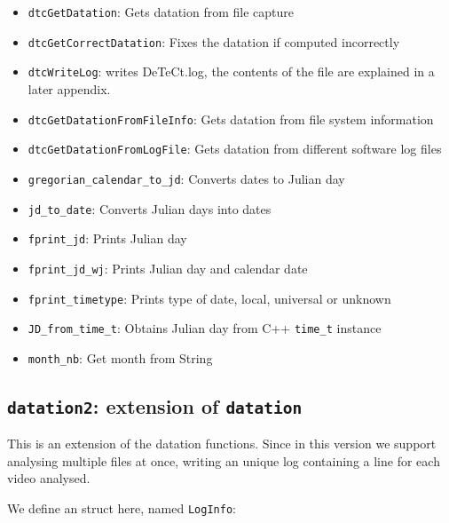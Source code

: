 \documentclass[a4paper,11pt]{memoir}
\begin{document}
\begin{itemize}
\item  \texttt{dtcGetDatation}: Gets datation from file capture
\item  \texttt{dtcGetCorrectDatation}: Fixes the datation if computed incorrectly
\item  \texttt{dtcWriteLog}: writes DeTeCt.log, the contents of the file are explained in a later
appendix.
\item  \texttt{dtcGetDatationFromFileInfo}: Gets datation from file system information
\item  \texttt{dtcGetDatationFromLogFile}: Gets datation from different software log files
\item  \texttt{gregorian\_calendar\_to\_jd}: Converts dates to Julian day
\item  \texttt{jd\_to\_date}: Converts Julian days into dates
\item  \texttt{fprint\_jd}: Prints Julian day
\item  \texttt{fprint\_jd\_wj}: Prints Julian day and calendar date
\item \texttt{fprint\_timetype}: Prints type of date, local, universal or unknown
\item  \texttt{JD\_from\_time\_t}: Obtains Julian day from C++ \texttt{time\_t} instance
\item \texttt{month\_nb}: Get month from String
\end{itemize}

\subsection{\texttt{datation2}: extension of \texttt{datation}}

This is an extension of the datation functions. Since in this version we support analysing multiple files at once, writing an unique log containing a line for each video analysed.

We define an struct here, named \texttt{LogInfo}:
\end{document}
